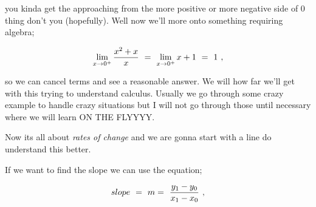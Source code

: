 \documentclass{article}
\begin{document}
you kinda get the approaching from the more positive or more negative side of \begin{math} 0 \end{math} thing don't you (hopefully). Well now we'll more onto something requiring algebra;

\begin{equation} \label{eq:304} 
\lim_{x\to0^{+}} \frac{x^2 + x}{x} \hspace{0.125cm} = \hspace{0.125cm} \lim_{x\to0^{+}} x + 1 \hspace{0.125cm} = \hspace{0.125cm} 1  \hspace{0.125cm} ,
\end{equation}

so we can cancel terms and see a reasonable answer. We will how far we'll get with this trying to understand calculus. Usually we go through some crazy example to handle crazy situations but I will not go through those until necessary where we will learn ON THE FLYYYY.

Now its all about \textit{rates of change} and we are gonna start with a line do understand this better. \\


If we want to find the slope we can use the equation;

\begin{equation} \label{eq:305} 
slope \hspace{0.125cm} = \hspace{0.125cm} m = \hspace{0.125cm} \frac{y_1 - y_0}{x_1 - x_0} \hspace{0.125cm},
\end{equation}
\end{document}
